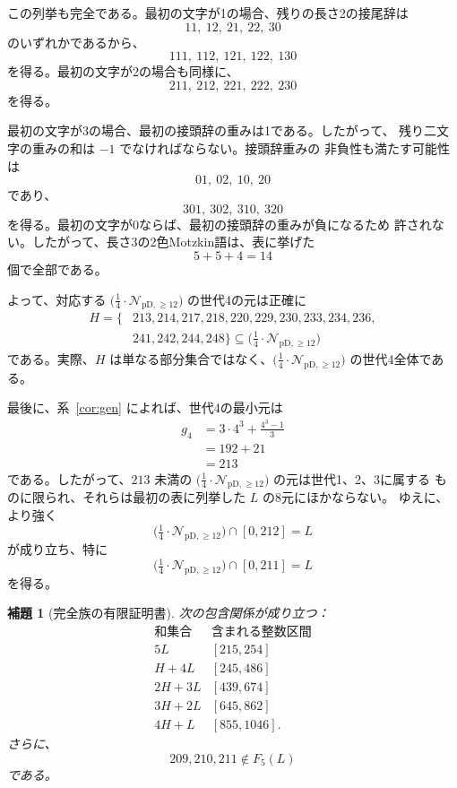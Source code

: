 \documentclass[12pt]{ltjsarticle}
\theoremstyle{plain}
\newtheorem{lemma}[theorem]{補題}
\theoremstyle{definition}
\theoremstyle{plain}
\newcommand{\Pset}{%
  \bigl(\tfrac{1}{4}\cdot\mathcal{N}_{\mathrm{pD},\geq 12}\bigr)%
}
\begin{document}
この列挙も完全である。最初の文字が1の場合、残りの長さ2の接尾辞は
\[
 11,\ 12,\ 21,\ 22,\ 30
\]
のいずれかであるから、
\[
 111,\ 112,\ 121,\ 122,\ 130
\]
を得る。最初の文字が2の場合も同様に、
\[
 211,\ 212,\ 221,\ 222,\ 230
\]
を得る。

最初の文字が3の場合、最初の接頭辞の重みは1である。したがって、
残り二文字の重みの和は $-1$ でなければならない。接頭辞重みの
非負性も満たす可能性は
\[
 01,\ 02,\ 10,\ 20
\]
であり、
\[
 301,\ 302,\ 310,\ 320
\]
を得る。最初の文字が0ならば、最初の接頭辞の重みが負になるため
許されない。したがって、長さ3の2色Motzkin語は、表に挙げた
\[
 5+5+4=14
\]
個で全部である。

よって、対応する $\Pset$ の世代4の元は正確に
\begin{equation}\label{eq:H-def}
\begin{split}
 H=\{&213,214,217,218,220,229,230,233,234,236,\\
     &241,242,244,248\}
 \subseteq\Pset
\end{split}
\end{equation}
である。実際、$H$ は単なる部分集合ではなく、$\Pset$ の世代4全体である。

最後に、系~\ref{cor:gen} によれば、世代4の最小元は
\[
\begin{aligned}
 g_4
 &=3\cdot4^3+\frac{4^3-1}{3}\\
 &=192+21\\
 &=213
\end{aligned}
\]
である。したがって、$213$ 未満の $\Pset$ の元は世代1、2、3に属する
ものに限られ、それらは最初の表に列挙した $L$ の8元にほかならない。
ゆえに、より強く
\[
 \Pset\cap[0,212]=L
\]
が成り立ち、特に
\begin{equation}\label{eq:P-small}
 \Pset\cap[0,211]=L
\end{equation}
を得る。

\begin{lemma}[完全族の有限証明書]\label{lem:finitefive}
次の包含関係が成り立つ：
\begin{equation}\label{eq:finite-interval-certificate}
\begin{array}{c|c}
\text{和集合}&\text{含まれる整数区間}\\ \hline
5L &[215,254]\\
H+4L &[245,486]\\
2H+3L &[439,674]\\
3H+2L &[645,862]\\
4H+L &[855,1046].
\end{array}
\end{equation}
さらに、
\begin{equation}\label{eq:finite-five-lower-certificate}
 209,210,211\notin F_5(L)
\end{equation}
である。
\end{lemma}
\end{document}
